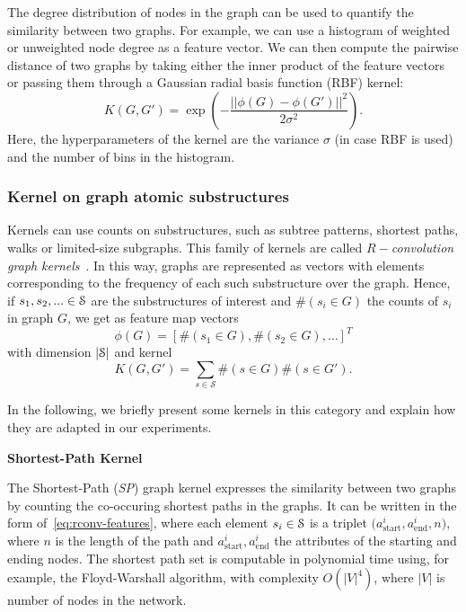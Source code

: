 The degree distribution of nodes in the graph can be used to quantify the similarity between two graphs.
For example, we can use a histogram of weighted or unweighted node degree as a feature vector.
We can then compute the pairwise distance of two graphs by taking either the inner product of the feature vectors or passing them through a Gaussian radial basis function (RBF) kernel:
\[ K(G,G') =\exp\left( -\frac{||\phi(G) - \phi(G')||^2}{2\sigma^2} \right).\]
Here, the hyperparameters of the kernel are the variance $ \sigma $ (in case RBF is used) and the number of bins in the histogram.

\subsubsection{Kernel on graph atomic substructures}

Kernels can use counts on substructures, such as subtree patterns, shortest paths, walks or limited-size subgraphs.
This family of kernels are called \emph{$R-$convolution graph kernels}~\cite{haussler}.
In this way, graphs are represented as vectors with elements corresponding to the frequency of each such substructure over the graph.
Hence, if
$ s_1, s_2, ... \in \mathcal{S}$ are the substructures of interest and $ \#\left(s_i \in G\right)$ the counts of $ s_i $ in graph $ G $, we get as feature map vectors
\[ 
\phi(G) = \left[\#\left(s_1 \in G\right), \#\left(s_2 \in G\right), \dots\right]^T
\label{eq:rconv-features}
\]
with dimension $ |\mathcal{S}| $  and kernel
\[
K(G, G') = \sum_{s \in \mathcal{S}} \#\left(s \in G\right) \#\left(s \in G'\right).
\]

In the following, we briefly present some kernels in this category and explain how they are adapted in our experiments.

\vspace{1em}
\noindent\textbf{Shortest-Path Kernel}

The Shortest-Path (\emph{SP}) graph kernel \cite{borgwardt2005} expresses the similarity between two graphs by counting the co-occuring shortest paths in the graphs.
It can be written in the form of~\cref{eq:rconv-features}, where each element $ s_i \in \mathcal{S} $ is a triplet $\big(a_{\text{start}}^i, a_{\text{end}}^i, n\big)$, where $ n $ is the length of the path and $ a_{\text{start}}^i, a_{\text{end}}^i $ the attributes of the starting and ending nodes.
The shortest path set is computable in polynomial time using, for example, the Floyd-Warshall algorithm, with complexity $ O(|V|^4)$, where $ |V| $ is number of nodes in the network.

